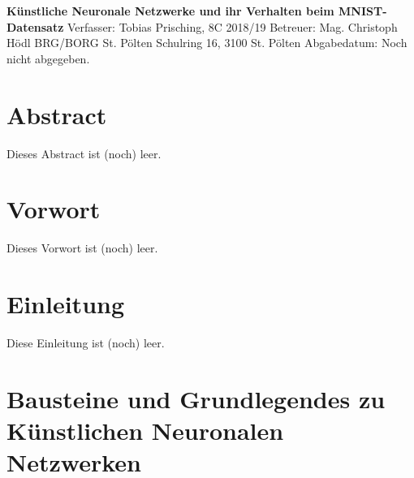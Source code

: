 \documentclass[a4paper,12pt,ngerman,oneside]{scrreprt}	%
\begin{document}
	

	\begin{titlepage}\label{Titleseite}
		
		\vspace*{80mm}\Huge\centering\textbf{Künstliche Neuronale Netzwerke \newline und ihr Verhalten beim MNIST-Datensatz\break}
		\vspace{0mm}\hrulefill
		\vspace{7mm}\Large{\break Verfasser: Tobias Prisching, 8C 2018/19 \break Betreuer: Mag. Christoph Hödl}
		\vspace{15mm}\Large{\break BRG/BORG St. Pölten \break Schulring 16, 3100 St. Pölten}
		\vspace{70mm}\Large{\break Abgabedatum: Noch nicht abgegeben.}
		
	\end{titlepage}
	
	
	\renewcommand{\abstractname}{Abstract}	
	\chapter*{Abstract}\label{Abstract}
		Dieses Abstract ist (noch) leer.\thispagestyle{empty}
	

	\begingroup
		\renewcommand*{\chapterpagestyle}{empty}
		\pagestyle{empty}
		\tableofcontents
		\clearpage
	\endgroup

	\chapter*{Vorwort}\label{Vorwort}
		Dieses Vorwort ist (noch) leer.
	
	\chapter*{Einleitung}\label{Einleitung}
		Diese Einleitung ist (noch) leer.



	\chapter{Bausteine und Grundlegendes zu Künstlichen Neuronalen Netzwerken}\label{1}
\end{document}
